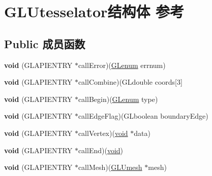 \hypertarget{struct_g_l_utesselator}{}\section{G\+L\+Utesselator结构体 参考}
\label{struct_g_l_utesselator}
\subsection*{Public 成员函数}
\begin{DoxyCompactItemize}
\item 
\mbox{\label{struct_g_l_utesselator_a84946476d4b8ed293eb14b8c240bc756}} 
{\bfseries void} (G\+L\+A\+P\+I\+E\+N\+T\+RY $\ast$call\+Error)(\hyperlink{interfacevoid}{G\+Lenum} errnum)
\item 
\mbox{\label{struct_g_l_utesselator_a9ce7adef2e04d459941e8689aa2d5d8e}} 
{\bfseries void} (G\+L\+A\+P\+I\+E\+N\+T\+RY $\ast$call\+Combine)(G\+Ldouble coords\mbox{[}3\mbox{]}
\item 
\mbox{\label{struct_g_l_utesselator_a4c220d07e8462fdfec5529f98946f44f}} 
{\bfseries void} (G\+L\+A\+P\+I\+E\+N\+T\+RY $\ast$call\+Begin)(\hyperlink{interfacevoid}{G\+Lenum} type)
\item 
\mbox{\label{struct_g_l_utesselator_a42b4f58796a012492fb2097d98ef8b0d}} 
{\bfseries void} (G\+L\+A\+P\+I\+E\+N\+T\+RY $\ast$call\+Edge\+Flag)(G\+Lboolean boundary\+Edge)
\item 
\mbox{\label{struct_g_l_utesselator_a199bfaf14877439a328ad233f209c9a4}} 
{\bfseries void} (G\+L\+A\+P\+I\+E\+N\+T\+RY $\ast$call\+Vertex)(\hyperlink{interfacevoid}{void} $\ast$data)
\item 
\mbox{\label{struct_g_l_utesselator_af6b75caf00b5ac5bc88e8a69efdd4c5c}} 
{\bfseries void} (G\+L\+A\+P\+I\+E\+N\+T\+RY $\ast$call\+End)(\hyperlink{interfacevoid}{void})
\item 
\mbox{\label{struct_g_l_utesselator_a62f1a387da546227bd04f50038aa64e7}} 
{\bfseries void} (G\+L\+A\+P\+I\+E\+N\+T\+RY $\ast$call\+Mesh)(\hyperlink{struct_g_l_umesh}{G\+L\+Umesh} $\ast$mesh)

\end{DoxyCompactItemize}
